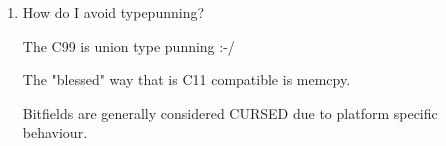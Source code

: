 \documentclass[11pt]{article}
\begin{document}
\begin{enumerate}
\item How do I avoid typepunning?
\label{sec:orgdf1a773}

The C99 is union type punning :-/

The "blessed" way that is C11 compatible is memcpy.

Bitfields are generally considered CURSED due to platform specific
behaviour.
\end{enumerate}
\end{document}
